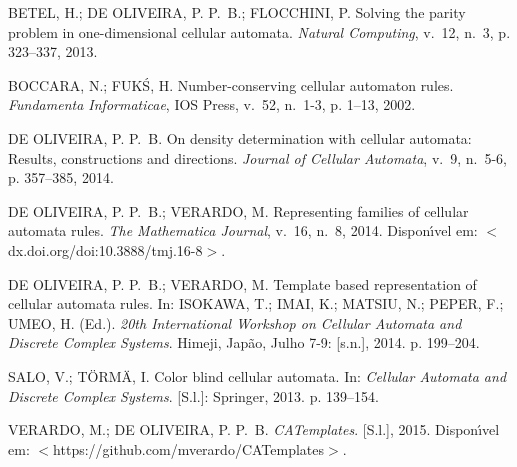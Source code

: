 \documentclass{llncs}
\begin{document}
%
%
\begin{thebibliography}{}
\providecommand{\abntrefinfo}[3]{}
\providecommand{\abntbstabout}[1]{}
\abntbstabout{1.52 }

\abntrefinfo{Betel, {DE OLIVEIRA} e Flocchini}{BETEL; {DE OLIVEIRA};
  FLOCCHINI}{2013}
{BETEL, H.; {DE OLIVEIRA}, P. P.~B.; FLOCCHINI, P. Solving the parity problem
  in one-dimensional cellular automata.
\emph{Natural Computing}, v.~12, n.~3, p. 323--337, 2013.}

\abntrefinfo{Boccara e {FUK\'{S}}}{BOCCARA; {FUK\'{S}}}{2002}
{BOCCARA, N.; {FUK\'{S}}, H. Number-conserving cellular automaton rules.
\emph{Fundamenta Informaticae}, IOS Press, v.~52, n.~1-3, p. 1--13, 2002.}

\abntrefinfo{{DE OLIVEIRA}}{{DE OLIVEIRA}}{2014}
{{DE OLIVEIRA}, P. P.~B. On density determination with cellular automata:
  Results, constructions and directions.
\emph{Journal of Cellular Automata}, v.~9, n.~5-6, p. 357--385, 2014.}

\abntrefinfo{{DE OLIVEIRA} e Verardo}{{DE OLIVEIRA}; VERARDO}{2014a}
{{DE OLIVEIRA}, P. P.~B.; VERARDO, M. Representing families of cellular
  automata rules.
\emph{The Mathematica Journal}, v.~16, n.~8, 2014.
Dispon{\'\i}vel em: $<$dx\-.doi\-.org\-/doi:10\-.3888\-/tmj\-.16-8$>$.}

\abntrefinfo{{DE OLIVEIRA} e Verardo}{{DE OLIVEIRA}; VERARDO}{2014b}
{{DE OLIVEIRA}, P. P.~B.; VERARDO, M. Template based representation of cellular
  automata rules. In:  ISOKAWA, T.; IMAI, K.; MATSIU, N.; PEPER, F.; UMEO, H.
  (Ed.). \emph{20th International Workshop on Cellular Automata and Discrete
  Complex Systems}. Himeji, Japão, Julho 7-9: [s.n.], 2014. p. 199--204.}

\abntrefinfo{Salo e T{\"o}rm{\"a}}{SALO; T{\"O}RM{\"A}}{2013}
{SALO, V.; T{\"O}RM{\"A}, I. Color blind cellular automata. In:  \emph{Cellular
  Automata and Discrete Complex Systems}. [S.l.]: Springer, 2013. p. 139--154.}

\abntrefinfo{Verardo e {DE OLIVEIRA}}{VERARDO; {DE OLIVEIRA}}{2015}
{VERARDO, M.; {DE OLIVEIRA}, P. P.~B. \emph{CATemplates}.
[S.l.], 2015. Dispon{\'\i}vel em:
  $<$https:\-/\-/github\-.com\-/mverardo\-/CATemplates$>$.}


\end{thebibliography}
\end{document}
